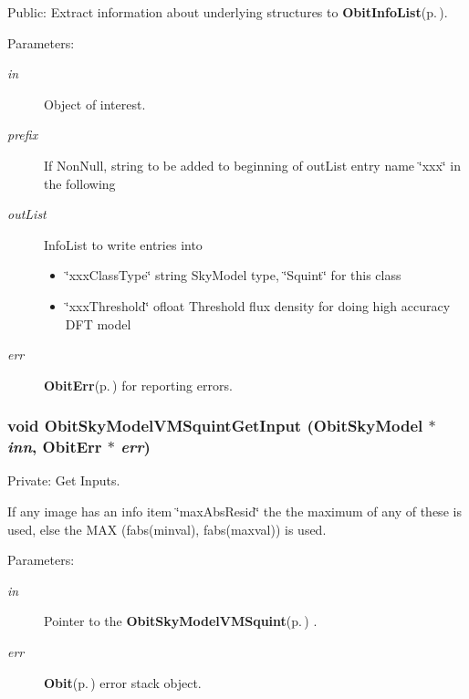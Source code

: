 Public: Extract information about underlying structures to {\bf Obit\-Info\-List}{\rm (p.\,\pageref{structObitInfoList})}. 

\begin{Desc}
\item[Parameters:]
\begin{description}
\item[{\em in}]Object of interest. \item[{\em prefix}]If Non\-Null, string to be added to beginning of out\-List entry name \char`\"{}xxx\char`\"{} in the following \item[{\em out\-List}]Info\-List to write entries into \begin{itemize}
\item \char`\"{}xxx\-Class\-Type\char`\"{} string Sky\-Model type, \char`\"{}Squint\char`\"{} for this class \item \char`\"{}xxx\-Threshold\char`\"{} ofloat Threshold flux density for doing high accuracy DFT model \end{itemize}
\item[{\em err}]{\bf Obit\-Err}{\rm (p.\,\pageref{structObitErr})} for reporting errors. \end{description}
\end{Desc}
\subsubsection{\setlength{\rightskip}{0pt plus 5cm}void Obit\-Sky\-Model\-VMSquint\-Get\-Input ({\bf Obit\-Sky\-Model} $\ast$ {\em inn}, {\bf Obit\-Err} $\ast$ {\em err})}\label{ObitSkyModelVMSquint_8c_a9}


Private: Get Inputs. 

If any image has an info item \char`\"{}max\-Abs\-Resid\char`\"{} the the maximum of any of these is used, else the MAX (fabs(minval), fabs(maxval)) is used. \begin{Desc}
\item[Parameters:]
\begin{description}
\item[{\em in}]Pointer to the {\bf Obit\-Sky\-Model\-VMSquint}{\rm (p.\,\pageref{structObitSkyModelVMSquint})} . \item[{\em err}]{\bf Obit}{\rm (p.\,\pageref{structObit})} error stack object. \end{description}
\end{Desc}
